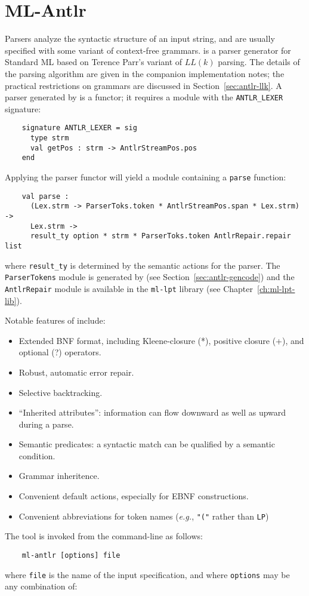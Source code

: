 %
\chapter{ML-Antlr}


Parsers analyze the syntactic structure of an input string, and are usually specified with some variant of context-free grammars.  \antlr{} is a parser generator for Standard ML based on Terence Parr's variant of $LL(k)$ parsing.  The details of the parsing algorithm are given in the companion implementation notes; the practical restrictions on grammars are discussed in Section~\ref{sec:antlr-llk}.  A parser generated by \antlr{} is a functor; it requires a module with the {\tt ANTLR\_LEXER} signature:
\begin{verbatim}
    signature ANTLR_LEXER = sig
      type strm
      val getPos : strm -> AntlrStreamPos.pos
    end
\end{verbatim}
Applying the parser functor will yield a module containing a {\tt parse} function:
\begin{verbatim}
    val parse : 
      (Lex.strm -> ParserToks.token * AntlrStreamPos.span * Lex.strm) -> 
      Lex.strm -> 
      result_ty option * strm * ParserToks.token AntlrRepair.repair list
\end{verbatim}
where {\tt result\_ty} is determined by the semantic actions for the parser.  The {\tt ParserTokens} module is generated by \antlr{} (see Section~\ref{sec:antlr-gencode}) and the {\tt AntlrRepair} module is available in the {\tt ml-lpt} library (see Chapter~\ref{ch:ml-lpt-lib}). 

Notable features of \antlr{} include:
\begin{itemize}
 \item Extended BNF format, including Kleene-closure (*), positive closure (+), and optional (?) operators.
 \item Robust, automatic error repair.
 \item Selective backtracking.
 \item ``Inherited attributes'': information can flow downward as well as upward during a parse.
 \item Semantic predicates: a syntactic match can be qualified by a semantic condition.
 \item Grammar inheritence.
 \item Convenient default actions, especially for EBNF constructions.
 \item Convenient abbreviations for token names (\emph{e{.}g{.}}, {\tt "("} rather than {\tt LP})
\end{itemize}
The tool is invoked from the command-line as follows:
\begin{verbatim}
    ml-antlr [options] file
\end{verbatim}
where {\tt file} is the name of the input \ulex{} specification, and where {\tt options} may be any combination of:

